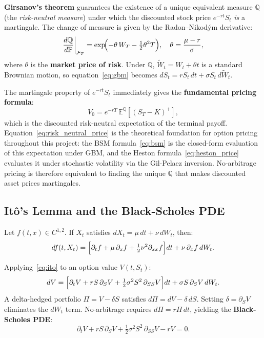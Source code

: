 \documentclass[12pt,a4paper]{article}
\begin{document}
\textbf{Girsanov's theorem} guarantees the existence of a unique
equivalent measure $\mathbb{Q}$ (the \emph{risk-neutral measure}) under which
the discounted stock price $e^{-rt}S_t$ \emph{is} a martingale.
The change of measure is given by the Radon--Nikod\'{y}m derivative:
\begin{equation}
  \frac{d\mathbb{Q}}{d\mathbb{P}}\bigg|_{\mathcal{F}_T}
  = \exp\!\Bigl(-\theta\,W_T - \tfrac12\theta^2 T\Bigr),
  \quad \theta = \frac{\mu-r}{\sigma},
  \label{eq:girsanov}
\end{equation}
where $\theta$ is the \textbf{market price of risk}.  Under $\mathbb{Q}$,
$\tilde{W}_t = W_t + \theta t$ is a standard Brownian motion, so
equation~\eqref{eq:gbm} becomes $dS_t = r S_t\,dt + \sigma S_t\,d\tilde{W}_t$.

The martingale property of $e^{-rt}S_t$ immediately gives the
\textbf{fundamental pricing formula}:
\begin{equation}
  V_0 = e^{-rT}\,\mathbb{E}^{\mathbb{Q}}[(S_T - K)^+],
  \label{eq:risk_neutral_price}
\end{equation}
which is the discounted risk-neutral expectation of the terminal payoff.
Equation~\eqref{eq:risk_neutral_price} is the theoretical foundation for
option pricing throughout this project: the BSM formula~\eqref{eq:bsm} is
the closed-form evaluation of this expectation under GBM, and the Heston
formula~\eqref{eq:heston_price} evaluates it under stochastic volatility
via the Gil-Pelaez inversion.  No-arbitrage pricing is therefore equivalent
to finding the unique $\mathbb{Q}$ that makes discounted asset prices martingales.

\subsection{It\^{o}'s Lemma and the Black-Scholes PDE}

\begin{theorem}[It\^{o}'s Lemma]
Let $f(t,x)\in C^{1,2}$.  If $X_t$ satisfies $dX_t = \mu\,dt + \nu\,dW_t$,
then:
\begin{equation}
  df(t,X_t) = \Bigl[\partial_t f + \mu\,\partial_x f
              + \tfrac12\nu^2\partial_{xx}f\Bigr]dt
              + \nu\,\partial_x f\,dW_t.
  \label{eq:ito}
\end{equation}
\end{theorem}

Applying~\eqref{eq:ito} to an option value $V(t,S_t)$:
\begin{equation}
  dV = \Bigl[\partial_t V + rS\,\partial_S V
       + \tfrac12\sigma^2 S^2\,\partial_{SS}V\Bigr]dt
       + \sigma S\,\partial_S V\,dW_t.
  \label{eq:dV}
\end{equation}
A delta-hedged portfolio $\Pi = V - \delta S$ satisfies
$d\Pi = dV - \delta\,dS$.  Setting $\delta = \partial_S V$ eliminates the
$dW_t$ term.  No-arbitrage requires $d\Pi = r\Pi\,dt$, yielding the
\textbf{Black-Scholes PDE}:
\begin{equation}
  \partial_t V + rS\,\partial_S V + \tfrac12\sigma^2 S^2\,\partial_{SS}V
  - rV = 0.
  \label{eq:bspde}
\end{equation}
\end{document}
